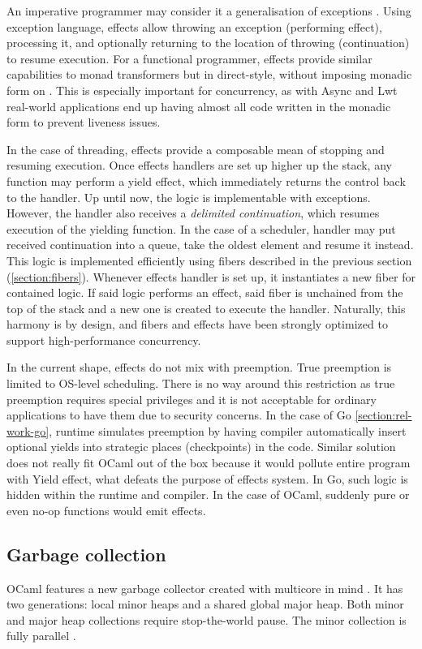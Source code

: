 \documentclass[12pt,a4paper,twoside]{report}
\begin{document}
An imperative programmer may consider it a generalisation of exceptions \cite{Brachthuser2020}. Using exception language, effects allow throwing an exception (performing effect), processing it, and optionally returning to the location of throwing (continuation) to resume execution. For a functional programmer, effects provide similar capabilities to monad transformers but in direct-style, without imposing monadic form on \cite{Sivaramakrishnan2021}. This is especially important for concurrency, as with Async and Lwt real-world applications end up having almost all code written in the monadic form to prevent liveness issues. 

In the case of threading, effects provide a composable mean of stopping and resuming execution. Once effects handlers are set up higher up the stack, any function may perform a yield effect, which immediately returns the control back to the handler. Up until now, the logic is implementable with exceptions. However, the handler also receives a \textit{delimited continuation}, which resumes execution of the yielding function. In the case of a scheduler, handler may put received continuation into a queue, take the oldest element and resume it instead. This logic is implemented efficiently using fibers described in the previous section (\ref{section:fibers}). Whenever effects handler is set up, it instantiates a new fiber for contained logic. If said logic performs an effect, said fiber is unchained from the top of the stack and a new one is created to execute the handler. Naturally, this harmony is by design, and fibers and effects have been strongly optimized to support high-performance concurrency. 

\label{paragraph:ocaml_preemption}
In the current shape, effects do not mix with preemption. True preemption is limited to OS-level scheduling. There is no way around this restriction as true preemption requires special privileges and it is not acceptable for ordinary applications to have them due to security concerns. In the case of Go \ref{section:rel-work-go}, runtime simulates preemption by having compiler automatically insert optional yields into strategic places (checkpoints) in the code. Similar solution does not really fit OCaml out of the box because it would pollute entire program with Yield effect, what defeats the purpose of effects system. In Go, such logic is hidden within the runtime and compiler. In the case of OCaml, suddenly pure or even no-op functions would emit effects. 

\subsection{Garbage collection}
\label{section:gc}
OCaml features a new garbage collector created with multicore in mind \cite{Sivaramakrishnan2020}. It has two generations: local minor heaps and a shared global major heap. Both minor and major heap collections require stop-the-world pause. The minor collection is fully parallel \cite{Sivaramakrishnan2020}.
\end{document}

